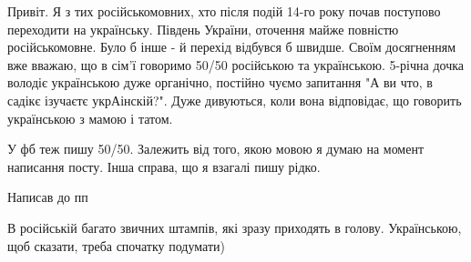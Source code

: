 \begin{itemize}

Привіт. Я з тих російськомовних, хто після подій 14-го року почав поступово
переходити на українську. Південь України, оточення майже повністю
російськомовне. Було б інше - й перехід відбувся б швидше. Своїм досягненням
вже вважаю, що в сім'ї говоримо 50/50 російською та українською. 5-річна дочка
володіє українською дуже органічно, постійно чуємо запитання "А ви что, в
садікє ізучаєтє укрАінскій?". Дуже дивуються, коли вона відповідає, що говорить
українською з мамою і татом.

У фб теж пишу 50/50. Залежить від того, якою мовою я думаю на момент написання
посту. Інша справа, що я взагалі пишу рідко.


Написав до пп


В російській багато звичних штампів, які зразу приходять в голову. Українською,
щоб сказати, треба спочатку подумати)


\end{itemize} %
